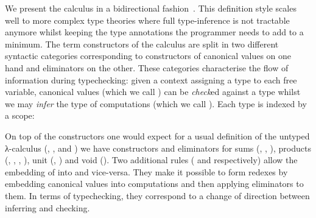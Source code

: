 
We present the calculus in a bidirectional fashion~\cite{pierce2000local}.
This definition style scales well to more complex type theories where full
type-inference is not tractable anymore whilst keeping the type annotations
the programmer needs to add to a minimum. The term constructors of the calculus
are split in two different syntactic categories corresponding to constructors
of canonical values on one hand and eliminators on the other. These categories
characterise the flow of information during typechecking: given a context
assigning a type to each free variable, canonical values (which we call \Checkable{})
can be \emph{check}ed against a type whilst we may \emph{infer} the type of
computations (which we call \Inferable{}). Each type is indexed by a scope:


On top of the constructors one would expect for a usual definition of
the untyped λ-calculus (\var{\cdot}, \app{\cdot}{\cdot}, and \lam{\cdot})
we have constructors and eliminators for sums (\inl{\cdot}, \inr{\cdot},
\cas{\cdot}{\cdot}{\cdot}{\cdot}), products (\prd{\cdot}, ,
\prl{\cdot}, \prr{\cdot}), unit (\uni{}, )
and void (\exf{\cdot}{\cdot}). Two additional rules (\neu{\cdot} and
\cut{\cdot}{\cdot} respectively) allow the embedding of \Inferable{}
into \Checkable{} and vice-versa. They make it possible to form redexes
by embedding canonical values into computations and then applying
eliminators to them. In terms of typechecking, they correspond to a
change of direction between inferring and checking.

